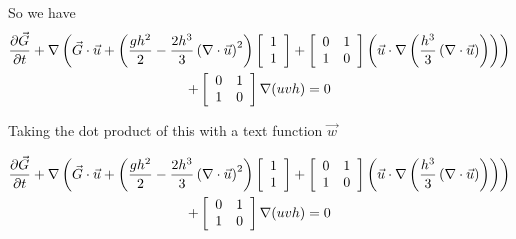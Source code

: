 \documentclass[12pt]{article}
\begin{document}
So we have
\begin{multline}
\frac{\partial \vec{G}}{\partial t} + \nabla\left(\vec{G} \cdot \vec{u} + \left(\frac{gh^2}{2} - \frac{2h^3}{3}\left(\nabla \cdot \vec{u}\right)^2\right)\left[\begin{array}{c}
1 \\
1\\
\end{array}\right] + \left[\begin{array}{c c}
0 & 1 \\
1 & 0\\
\end{array}\right]\left(\vec{u} \cdot \nabla\left( \frac{h^3}{3} \left(\nabla \cdot \vec{u}\right)\right) \right)\right) \\ + \left[\begin{array}{c c}
0 & 1 \\
1 & 0\\
\end{array}\right] \nabla (uvh)  = 0
\end{multline}

Taking the dot product of this with a text function $\vec{w}$

\begin{multline}
\frac{\partial \vec{G}}{\partial t} + \nabla\left(\vec{G} \cdot \vec{u} + \left(\frac{gh^2}{2} - \frac{2h^3}{3}\left(\nabla \cdot \vec{u}\right)^2\right)\left[\begin{array}{c}
1 \\
1\\
\end{array}\right] + \left[\begin{array}{c c}
0 & 1 \\
1 & 0\\
\end{array}\right]\left(\vec{u} \cdot \nabla\left( \frac{h^3}{3} \left(\nabla \cdot \vec{u}\right)\right) \right)\right) \\ + \left[\begin{array}{c c}
0 & 1 \\
1 & 0\\
\end{array}\right] \nabla (uvh)  = 0
\end{multline}
\end{document}
